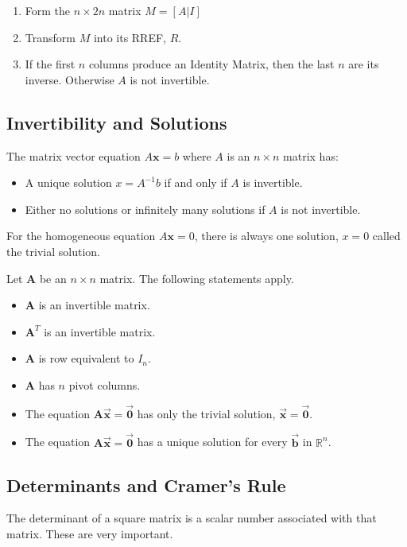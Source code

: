 \documentclass[12pt, landscape, twocolumn]{article}
\newcommand{\ma}[0]{\mathbf{A} }        %
\let\oldvec\vec
\renewcommand{\vec}[1]{\oldvec{\mathbf{ #1 } } }                    %
\begin{document}
        \begin{enumerate}
        \item Form the $n \times 2n$ matrix $M=\left[A|I\right]$
        \item Transform $M$ into its RREF, $R$.
        \item If the first $n$ columns produce an Identity Matrix, then the last $n$ are its inverse. Otherwise $A$ is not invertible.
        \end{enumerate}

    \subsection{Invertibility and Solutions}
    The matrix vector equation $A\mathbf{x} = b$ where $A$ is an $n \times n$ matrix has:
        \begin{itemize}
        \item A unique solution $x=A^{-1} b$ if and only if $A$ is invertible.
        \item Either no solutions or infinitely many solutions if $A$ is not invertible.
        \end{itemize}

    For the homogeneous equation $A \mathbf{x} = 0$, there is always one solution, $x=0$ called the trivial solution.

    Let $\ma$ be an $n \times n$ matrix. The following statements apply.
    \begin{itemize}
        \item $\ma$ is an invertible matrix.
        \item $\ma^T$ is an invertible matrix.
        \item $\ma$ is row equivalent to $I_n$.
        \item $\ma$ has $n$ pivot columns.
        \item The equation $\ma \vec{x} = \vec{0}$ has only the trivial solution, $\vec{x}=\vec{0}$.
        \item The equation $\ma \vec{x} = \vec{0}$ has a unique solution for every $\vec{b}$ in $\mathbb{R}^n$.
    \end{itemize}

    \subsection{Determinants and Cramer's Rule}
    The determinant of a square matrix is a scalar number associated with that matrix. These are very important.
\end{document}
